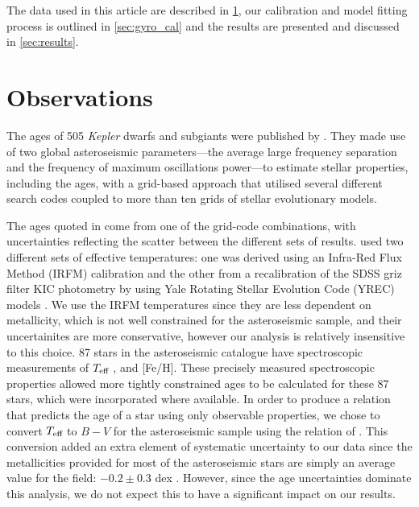 \documentclass[useAMS, usenatbib]{mn2e}
\newcommand{\teff}{$T_{\rm{eff}}$}
\begin{document}
The data used in this article are described in \textsection \ref{sec:data},
our calibration and model fitting process is outlined in \textsection
\ref{sec:gyro_cal} and the results are presented and discussed in \textsection
\ref{sec:results}.

\section{Observations}
\label{sec:data}

The ages of 505 {\it Kepler} dwarfs and subgiants were published by
\citet{Chaplin2014}.
They made use of two global asteroseismic parameters---the average large
frequency separation and the frequency of maximum oscillations power---to
estimate stellar properties, including the ages, with a grid-based approach
that utilised several different search codes coupled to more than ten grids of
stellar evolutionary models.

The ages quoted in \citet{Chaplin2014} come from one of the grid-code
combinations, with uncertainties reflecting the scatter between the different
sets of results.
\citet{Chaplin2014} used two different sets of effective temperatures: one was
derived using an Infra-Red Flux Method (IRFM) calibration
\citep{Casagrande2010, SilvaAguirre2012} and the other from a recalibration of
the SDSS griz filter KIC photometry by \citet{Pinsonneault2012} using Yale
Rotating Stellar Evolution Code (YREC) models \citep{Demarque2004}.
We use the IRFM temperatures since they are less dependent on metallicity,
which is not well constrained for the asteroseismic sample, and their
uncertainites are more conservative, however our analysis is relatively
insensitive to this choice.
87 stars in the asteroseismic catalogue have spectroscopic measurements of
\teff$~$, and [Fe/H].
These precisely measured spectroscopic properties allowed more tightly
constrained ages to be calculated for these 87 stars, which were
incorporated where available.
In order to produce a relation that predicts the age of a star using only
observable properties, we chose to convert \teff$~$to $B-V$ for the
asteroseismic sample using the relation of \citet{Sekiguchi2000}.
This conversion added an extra element of systematic uncertainty to our data
since the metallicities provided for most of the asteroseismic stars are
simply an average value for the field: $-0.2\pm0.3$ dex \citep[see e.g.][]{Silva_Aguirre2011}.  %
However, since the age uncertainties dominate this analysis, we do not expect
this to have a significant impact on our results.
\end{document}
